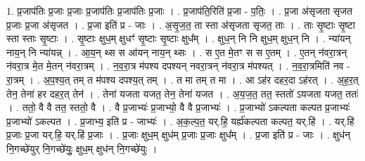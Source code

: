 \documentclass[17pt]{extarticle}
\begin{document}
1. प्र॒जाप॑तिः प्र॒जाः प्र॒जाः प्र॒जाप॑तिः प्र॒जाप॑तिः प्र॒जाः । . प्र॒जाप॑ति॒रिति॑ प्र॒जा - प॒तिः॒ । . प्र॒जा अ॑सृजता सृजत प्र॒जाः प्र॒जा अ॑सृजत । . प्र॒जा इति॑ प्र - जाः । . अ॒सृ॒ज॒त॒ ता स्ता अ॑सृजता सृजत॒ ताः । . ताः सृ॒ष्टाः सृ॒ष्टा स्ता स्ताः सृ॒ष्टाः । . सृ॒ष्टाः क्षुध॒म् क्षुधꣳ॑ सृ॒ष्टाः सृ॒ष्टाः क्षुध᳚म् । . क्षुध॒न् नि नि क्षुध॒म् क्षुध॒न् नि । . न्या॑यन् नाय॒न् नि न्या॑यन्न् । . आ॒य॒न् थ्स स आ॑यन् नाय॒न् थ्सः । . स ए॒त मे॒तꣳ स स ए॒तम् । . ए॒तन् न॑वरा॒त्रन् न॑वरा॒त्र मे॒त मे॒तन् न॑वरा॒त्रम् । . न॒व॒रा॒त्र म॑पश्य दपश्यन् नवरा॒त्रन् न॑वरा॒त्र म॑पश्यत् । . न॒व॒रा॒त्रमिति॑ नव - रा॒त्रम् । . अ॒प॒श्य॒त् तम् त म॑पश्य दपश्य॒त् तम् । . त मा तम् त मा । . आ ऽह॑र दहर॒दा ऽह॑रत् । . अ॒ह॒र॒त् तेन॒ तेना॑ हर दहर॒त् तेन॑ । . तेना॑ यजता यजत॒ तेन॒ तेना॑ यजत । . अ॒य॒ज॒त॒ तत॒ स्ततो॑ ऽयजता यजत॒ ततः॑ । . ततो॒ वै वै तत॒ स्ततो॒ वै । . वै प्र॒जाभ्यः॑ प्र॒जाभ्यो॒ वै वै प्र॒जाभ्यः॑ । . प्र॒जाभ्यो॑ ऽकल्पता कल्पत प्र॒जाभ्यः॑ प्र॒जाभ्यो॑ ऽकल्पत । . प्र॒जाभ्य॒ इति॑ प्र - जाभ्यः॑ । . अ॒क॒ल्प॒त॒ यर्.हि॒ यर्ह्य॑कल्पता कल्पत॒ यर्.हि॑ । . यर्.हि॑ प्र॒जाः प्र॒जा यर्.हि॒ यर्.हि॑ प्र॒जाः । . प्र॒जाः क्षुध॒म् क्षुध॑म् प्र॒जाः प्र॒जाः क्षुध᳚म् । . प्र॒जा इति॑ प्र - जाः । . क्षुध॑न् नि॒गच्छे॑युर् नि॒गच्छे॑युः॒ क्षुध॒म् क्षुध॑न् नि॒गच्छे॑युः । \newline
\end{document}
